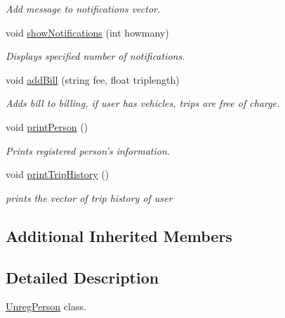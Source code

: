 \begin{DoxyCompactItemize}
\begin{DoxyCompactList}\small\item\em Add message to notifications vector. \end{DoxyCompactList}\item 
void \hyperlink{class_reg_person_a5013a9edcbfd91a172f94a5c6a707442}{show\+Notifications} (int howmany)
\begin{DoxyCompactList}\small\item\em Displays specified number of notifications. \end{DoxyCompactList}\item 
void \hyperlink{class_reg_person_a79fe3960ee3518cca16a94535852b2c1}{add\+Bill} (string fee, float triplength)
\begin{DoxyCompactList}\small\item\em Adds bill to billing, if user has vehicles, trips are free of charge. \end{DoxyCompactList}\item 
\hypertarget{class_reg_person_a83b75667247384c8f2e083ca17f095e0}{void \hyperlink{class_reg_person_a83b75667247384c8f2e083ca17f095e0}{print\+Person} ()}\label{class_reg_person_a83b75667247384c8f2e083ca17f095e0}

\begin{DoxyCompactList}\small\item\em Prints registered person's information. \end{DoxyCompactList}\item 
\hypertarget{class_reg_person_a3daa5293f513d5b7a30477a044d3ff6f}{void \hyperlink{class_reg_person_a3daa5293f513d5b7a30477a044d3ff6f}{print\+Trip\+History} ()}\label{class_reg_person_a3daa5293f513d5b7a30477a044d3ff6f}

\begin{DoxyCompactList}\small\item\em prints the vector of trip history of user \end{DoxyCompactList}\end{DoxyCompactItemize}
\subsection*{Additional Inherited Members}


\subsection{Detailed Description}
\hyperlink{class_unreg_person}{Unreg\+Person} class. 

